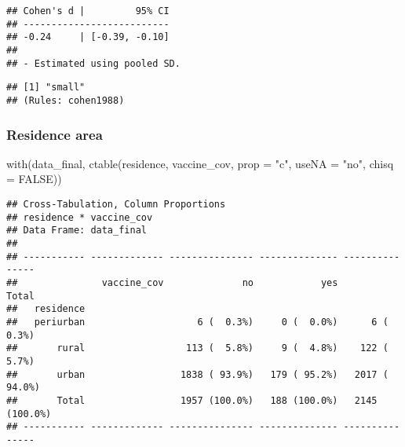 \documentclass[
]{article}
\newenvironment{Shaded}{\begin{snugshade}}{\end{snugshade}}
\newcommand{\AttributeTok}[1]{\textcolor[rgb]{0.77,0.63,0.00}{#1}}
\newcommand{\ConstantTok}[1]{\textcolor[rgb]{0.00,0.00,0.00}{#1}}
\newcommand{\FunctionTok}[1]{\textcolor[rgb]{0.00,0.00,0.00}{#1}}
\newcommand{\NormalTok}[1]{#1}
\newcommand{\SpecialCharTok}[1]{\textcolor[rgb]{0.00,0.00,0.00}{#1}}
\newcommand{\StringTok}[1]{\textcolor[rgb]{0.31,0.60,0.02}{#1}}
\begin{document}
\begin{verbatim}
## Cohen's d |         95% CI
## --------------------------
## -0.24     | [-0.39, -0.10]
## 
## - Estimated using pooled SD.
\end{verbatim}

\begin{Shaded}
\end{Shaded}

\begin{verbatim}
## [1] "small"
## (Rules: cohen1988)
\end{verbatim}

\hypertarget{residence-area}{%
\subsubsection{Residence area}\label{residence-area}}

\begin{Shaded}
\begin{Highlighting}[]
\FunctionTok{with}\NormalTok{(data\_final, }\FunctionTok{ctable}\NormalTok{(residence, vaccine\_cov, }\AttributeTok{prop =} \StringTok{"c"}\NormalTok{, }\AttributeTok{useNA =} \StringTok{"no"}\NormalTok{, }\AttributeTok{chisq =} \ConstantTok{FALSE}\NormalTok{))}
\end{Highlighting}
\end{Shaded}

\begin{verbatim}
## Cross-Tabulation, Column Proportions  
## residence * vaccine_cov  
## Data Frame: data_final  
## 
## ----------- ------------- --------------- -------------- ---------------
##               vaccine_cov              no            yes           Total
##   residence                                                             
##   periurban                    6 (  0.3%)     0 (  0.0%)      6 (  0.3%)
##       rural                  113 (  5.8%)     9 (  4.8%)    122 (  5.7%)
##       urban                 1838 ( 93.9%)   179 ( 95.2%)   2017 ( 94.0%)
##       Total                 1957 (100.0%)   188 (100.0%)   2145 (100.0%)
## ----------- ------------- --------------- -------------- ---------------
\end{verbatim}

\begin{Shaded}
\end{Shaded}
\end{document}
